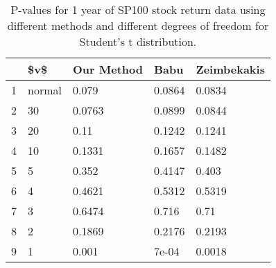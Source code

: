 \begin{table}[ht]
\centering
\caption{P-values for 1 year of SP100 stock return data using different 
  methods
  and different degrees of freedom for Student's t distribution.} 
\label{table:SP1001}
\begin{tabular}{rllll}
  \hline
 & \$v\$ & Our Method & Babu & Zeimbekakis \\ 
  \hline
1 & normal & 0.079 & 0.0864 & 0.0834 \\ 
  2 & 30 & 0.0763 & 0.0899 & 0.0844 \\ 
  3 & 20 & 0.11 & 0.1242 & 0.1241 \\ 
  4 & 10 & 0.1331 & 0.1657 & 0.1482 \\ 
  5 & 5 & 0.352 & 0.4147 & 0.403 \\ 
  6 & 4 & 0.4621 & 0.5312 & 0.5319 \\ 
  7 & 3 & 0.6474 & 0.716 & 0.71 \\ 
  8 & 2 & 0.1869 & 0.2176 & 0.2193 \\ 
  9 & 1 & 0.001 & 7e-04 & 0.0018 \\ 
   \hline
\end{tabular}
\end{table}

